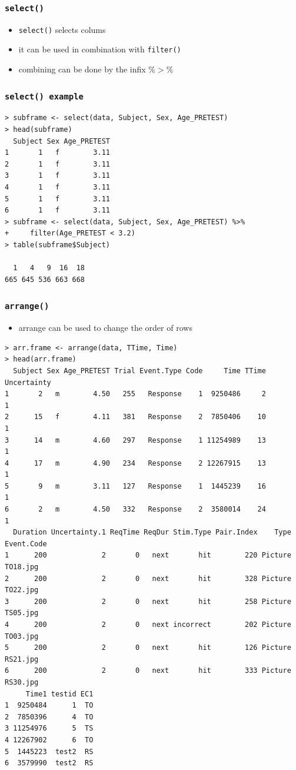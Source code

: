 \documentclass[xcolor={table},c]{beamer}
\begin{document}
\begin{frame}[fragile]\frametitle{\texttt{select()}}
  \begin{itemize}
  \item \texttt{select()} selects colums
  \item it can be used in combination with \texttt{filter()}
  \item combining can be done by the infix $\%>\%$
  \end{itemize}
\end{frame}

\begin{frame}[fragile]\frametitle{\texttt{select() example}}\footnotesize
\begin{verbatim}
> subframe <- select(data, Subject, Sex, Age_PRETEST)
> head(subframe)
  Subject Sex Age_PRETEST
1       1   f        3.11
2       1   f        3.11
3       1   f        3.11
4       1   f        3.11
5       1   f        3.11
6       1   f        3.11
> subframe <- select(data, Subject, Sex, Age_PRETEST) %>%
+     filter(Age_PRETEST < 3.2)
> table(subframe$Subject)

  1   4   9  16  18 
665 645 536 663 668 
\end{verbatim}
\end{frame}


\begin{frame}[fragile]\frametitle{\texttt{arrange()}}
  \begin{itemize}
  \item arrange can be used to change the order of rows
  \end{itemize}\tiny
\begin{verbatim}
> arr.frame <- arrange(data, TTime, Time)
> head(arr.frame)
  Subject Sex Age_PRETEST Trial Event.Type Code     Time TTime Uncertainty
1       2   m        4.50   255   Response    1  9250486     2           1
2      15   f        4.11   381   Response    2  7850406    10           1
3      14   m        4.60   297   Response    1 11254989    13           1
4      17   m        4.90   234   Response    2 12267915    13           1
5       9   m        3.11   127   Response    1  1445239    16           1
6       2   m        4.50   332   Response    2  3580014    24           1
  Duration Uncertainty.1 ReqTime ReqDur Stim.Type Pair.Index    Type Event.Code
1      200             2       0   next       hit        220 Picture   TO18.jpg
2      200             2       0   next       hit        328 Picture   TO22.jpg
3      200             2       0   next       hit        258 Picture   TS05.jpg
4      200             2       0   next incorrect        202 Picture   TO03.jpg
5      200             2       0   next       hit        126 Picture   RS21.jpg
6      200             2       0   next       hit        333 Picture   RS30.jpg
     Time1 testid EC1
1  9250484      1  TO
2  7850396      4  TO
3 11254976      5  TS
4 12267902      6  TO
5  1445223  test2  RS
6  3579990  test2  RS  
\end{verbatim}
\end{frame}
\end{document}
